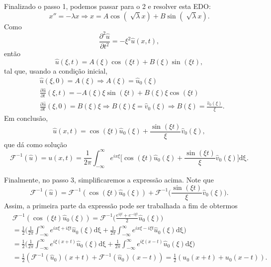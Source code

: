\documentclass[../pde_notes.tex]{subfiles}
\begin{document}
Finalizado o passo 1, podemos passar para o 2 e resolver esta EDO:
\[
	x'' = - \lambda x \Rightarrow x = A \cos^{}{(\sqrt[]{\lambda }x)} + B \sin^{}{(\sqrt[]{\lambda }x)}.
\]
Como
\[
	\frac{\partial^{2}\hat{u}}{\partial t^{2}} = -\xi^{2}\hat{u}(x, t),
\]
então
\[
	\hat{u}(\xi , t) = A(\xi )\cos^{}{(\xi t)} + B(\xi )\sin^{}{(\xi t)},
\]
tal que, usando a condição inicial,
\begin{align*}
	 & \hat{u}(\xi , 0) = A(\xi )\Rightarrow A(\xi ) = \hat{u}_{0}(\xi )                                                                                               \\
	 & \frac{\partial^{}\hat{u}}{\partial t^{}}(\xi , t) = -A(\xi )\xi \sin^{}{(\xi t)} + B(\xi )\xi \cos^{}{(\xi t)}                                                  \\
	 & \frac{\partial^{}\hat{u}}{\partial t^{}}(\xi , 0) = B(\xi )\xi  \Rightarrow B(\xi )\xi = \hat{v}_{0}(\xi )\Rightarrow B(\xi ) = \frac{\hat{v}_{0}(\xi )}{\xi }.
\end{align*}
Em conclusão,
\[
	\hat{u}(x, t) = \cos^{}{(\xi t)}\hat{u}_{0}(\xi ) + \frac{\sin^{}{(\xi t)}}{\xi }\hat{v}_{0}(\xi ),
\]
que dá como solução
\[
	\mathcal{F}^{-1}(\hat{u}) = u(x, t) = \frac{1}{2\pi }\int_{-\infty}^{\infty}e^{ix\xi }\biggl[\cos^{}{(\xi t)}\hat{u}_{0}(\xi ) + \frac{\sin^{}{(\xi t)}}{\xi }\hat{v}_{0}(\xi )\biggr] \mathrm{d\xi }.
\]

Finalmente, no passo 3, simplificaremos a expressão acima. Note que
\[
	\mathcal{F}^{-1}(\hat{u}) = \mathcal{F}^{-1}(\cos^{}{(\xi t)}\hat{u}_{0}(\xi )) + \mathcal{F}^{-1}\biggl(\frac{\sin^{}{(\xi t)}}{\xi }\hat{v}_{0}(\xi )\biggr).
\]
Assim, a primeira parte da expressão pode ser trabalhada a fim de obtermos
\begin{align*}
	 & \mathcal{F}^{-1}(\cos^{}{(\xi t)}\hat{u}_{0}(\xi )) = \mathcal{F}^{-1}\biggl(\frac{e^{i\xi t} + e^{-i\xi t}}{2}\hat{u}_{0}(\xi )\biggr)                                                                      \\
	 & =\frac{1}{2}\biggl(\frac{1}{2\pi }\int_{-\infty}^{\infty}e^{ix\xi +i\xi t}\hat{u}_{0}(\xi ) \mathrm{d\xi } + \frac{1}{2\pi }\int_{-\infty}^{\infty}e^{ix\xi - i\xi t}\hat{u}_{0}(\xi ) \mathrm{d\xi }\biggr) \\
	 & =\frac{1}{2}\biggl(\frac{1}{2\pi }\int_{-\infty}^{\infty}e^{i\xi (x+t)}\hat{u}_{0}(\xi ) \mathrm{d\xi } + \frac{1}{2\pi }\int_{-\infty}^{\infty}e^{i\xi (x-t)}\hat{u}_{0}(\xi ) \mathrm{d}\xi \biggr)        \\
	 & = \frac{1}{2}(\mathcal{F}^{-1}(\hat{u}_{0})(x+t) + \mathcal{F}^{-1}(\hat{u}_{0})(x-t)) = \frac{1}{2}(u_{0}(x+t) + u_{0}(x-t)).
\end{align*}
\end{document}
